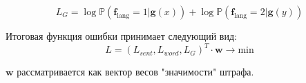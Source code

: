 \documentclass[12pt,twoside]{article}
\begin{document}
$$L_{G} = \log \mathbb{P}(\mathbf{f}_{\text{lang}} = 1| \mathbf{g}(x)) + \log \mathbb{P}(\mathbf{f}_{\text{lang}} = 2|\mathbf{g}(y))$$

Итоговая функция ошибки принимает следующий вид:
$$L = (L_{sent}, L_{word}, L_{G})^T \cdot \mathbf{w} \to \text{min}$$

$\mathbf{w}$ рассматривается как вектор весов "значимости" штрафа.






\end{document}
